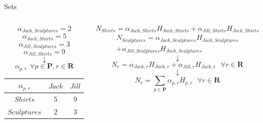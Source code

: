 \documentclass[10pt, aspectratio=169]{beamer}
\begin{document}
\begin{frame}{Sets}
    \begin{columns}
        \begin{column}{0.5\textwidth}
            $$\alpha_{Jack,Sculptures} = 2$$
            $$\alpha_{Jack,Shirts} = 5$$
            $$\alpha_{Jill,Sculptures} = 3$$
            $$\alpha_{Jill,Shirts} = 9$$
            $$\downarrow$$
            $$\alpha_{p,r} \ \ \forall p \in \textbf{P}, r \in \textbf{R}$$
            \begin{center}
                \begin{tabular}{|c||c|c|}
                    \hline
                    $\alpha_{p,r}$ & $Jack$ & $Jill$ \\ 
                    \hline \hline
                    $Shirts$ & 5 & 9 \\  
                    \hline
                    $Sculptures$ & 2 & 3\\
                    \hline  
                \end{tabular}
            \end{center}
        \end{column}
        \begin{column}{0.5\textwidth}
            $$N_{Shirts} = \alpha_{Jack,Shirts} H_{Jack,Shirts} + \alpha_{Jill,Shirts} H_{Jack,Shirts}$$
            \begin{equation}
                \begin{split}
                    N_{Sculptures} = \alpha_{Jack,Sculptures} H_{Jack,Sculptures} \\ + \alpha_{Jill,Sculptures} H_{Jack,Sculptures}
                \end{split}
                \tag*{}
            \end{equation}
            $$\downarrow$$
            $$N_{r} = \alpha_{Jack,r} H_{Jack,r} + \alpha_{Jill,r} H_{Jack,r}\ \ \ \forall r \in \textbf{R}$$
            $$\downarrow$$
            $$N_{r} = \sum_{p \in \textbf{P}} \alpha_{p,r} H_{p,r}\ \ \ \forall r \in \textbf{R}$$
        \end{column}
    \end{columns}
\end{frame}
\end{document}
